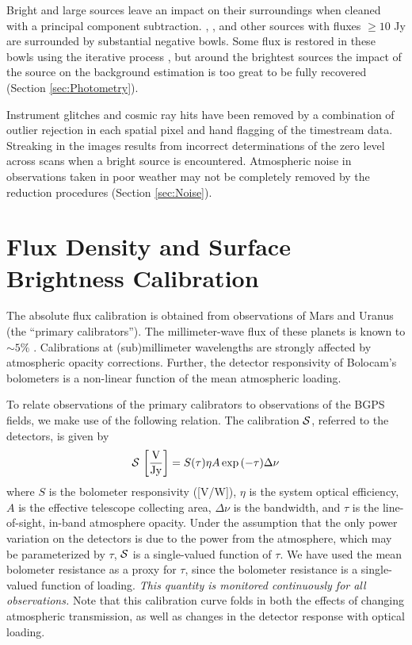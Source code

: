 \documentclass[12pt,preprint]{aastex}
\begin{document}
Bright and large sources leave an impact on their surroundings when
cleaned with a principal component subtraction.  ,
, and other sources with fluxes $\geq 10$ Jy are
surrounded by substantial negative bowls.  Some flux is restored in
these bowls using the iterative process 
, but around the brightest sources the impact of the source on the
background estimation is too great to be fully recovered (Section
\ref{sec:Photometry}).

Instrument glitches and cosmic ray hits have been removed by a
combination of outlier rejection in each spatial pixel and hand
flagging of the timestream data.  Streaking in the images results from
incorrect determinations of the zero level across scans when a bright
source is encountered.  Atmospheric noise in observations taken in
poor weather may not be completely removed by the reduction
procedures (Section \ref{sec:Noise}).

\section{Flux Density and Surface Brightness Calibration}
\label{sec:FluxCalibration}

The absolute flux calibration is obtained from observations of Mars
and Uranus
(the ``primary calibrators'').  The millimeter-wave flux of these
planets is known to $\sim 5\%$ \citep{orton86,griffin93}.
Calibrations at (sub)millimeter wavelengths are strongly affected by
atmospheric opacity corrections.  Further, the detector responsivity
of Bolocam's bolometers is a non-linear function of the mean
atmospheric loading.

To relate observations of the primary calibrators to observations of
the BGPS fields, we make use of the following relation.  The
calibration ${\cal S}$, referred to the detectors, is given by
\begin{equation}
\label{eq:Calibration}
{\cal S} \, \left[\mathrm{\frac{V}{Jy}}\right] = 
S(\tau) \eta A \exp{(-\tau)} \Delta\nu
\end{equation}
where $S$ is the bolometer responsivity ([V/W]), $\eta$ is the system
optical efficiency, $A$ is the effective telescope collecting area,
$\Delta \nu$ is the bandwidth, and $\tau$ is the line-of-sight,
in-band atmosphere opacity.  Under the assumption that the only power
variation on the detectors is due to the power from the atmosphere,
which may be parameterized by $\tau$, ${\cal S}$ is a single-valued
function of $\tau$.  We have used the mean bolometer resistance as a
proxy for $\tau$, since the bolometer resistance is a single-valued
function of loading.  {\it This quantity is monitored continuously for
all observations.}  Note that this calibration curve folds in both the
effects of changing atmospheric transmission, as well as changes in
the detector response with optical loading.
\end{document}
